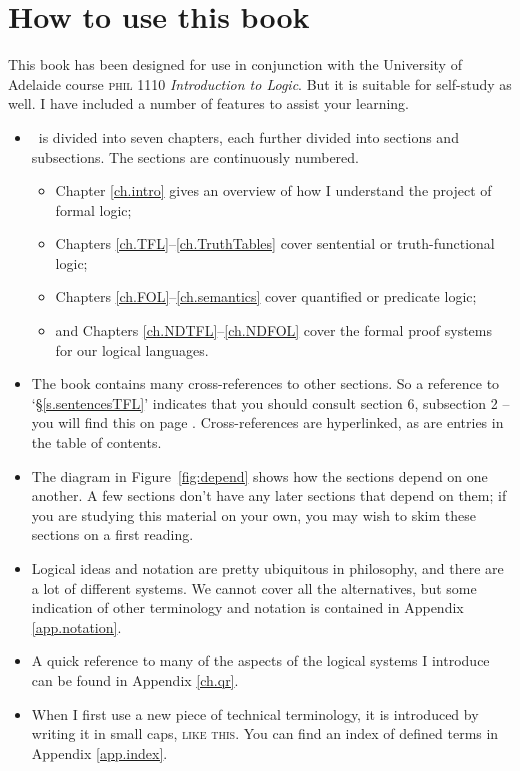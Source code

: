 {\newpage
\tableofcontents*

\chapter*{How to use this book}

This book has been designed for use in conjunction with the University of Adelaide course \textsc{phil} 1110 \emph{Introduction to Logic}. But it is suitable for self-study as well. I have included a number of features to assist your learning. \begin{itemize}
	\item \forallx\ is divided into seven chapters, each further divided into sections and subsections. The sections are continuously numbered. \begin{itemize}
		\item Chapter \ref{ch.intro} gives an overview of how I understand the project of formal logic;
		\item Chapters \ref{ch.TFL}–\ref{ch.TruthTables} cover sentential or truth-functional logic;
		\item Chapters \ref{ch.FOL}–\ref{ch.semantics} cover quantified or predicate logic;
		\item and Chapters \ref{ch.NDTFL}–\ref{ch.NDFOL} cover the formal proof systems for our logical languages.
	\end{itemize}
	\item The book contains many cross-references to other sections. So a reference to `§\ref{s.sentencesTFL}' indicates that you should consult section 6, subsection 2 – you will find this on page \pageref{s.sentencesTFL}. Cross-references are hyperlinked, as are entries in the table of contents.
	\item The diagram in Figure~\ref{fig:depend} shows how the sections depend on one another. A few sections don't have any later sections that depend on them; if you are studying this material on your own, you may wish to skim these sections on a first reading.
	\item Logical ideas and notation are pretty ubiquitous in philosophy, and there are a lot of different systems. We cannot cover all the alternatives, but some indication of other terminology and notation is contained in Appendix \ref{app.notation}.
	\item A quick reference to many of the aspects of the logical systems I introduce can be found in Appendix \ref{ch.qr}.
	\item When I first use a new piece of technical terminology, it is introduced by writing it in small caps, \textsc{like this}. You can find an index of defined terms in Appendix \ref{app.index}.

\end{itemize}}
